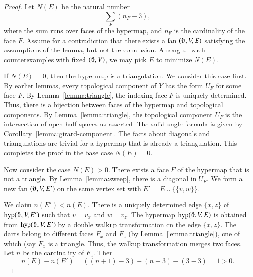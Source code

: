 \begin{proof}
Let $N(E)$ be the natural number
$$
\sum_F (n_F - 3),
$$
where the sum runs over faces of the hypermap, and $n_F$ is the
cardinality of the face $F$.
Assume for a contradiction that there exists a fan $(\orgn,V,E)$ 
satisfying the assumptions of the lemma, but not the conclusion.
Among all such counterexamples with fixed $(\orgn,V)$, we may pick
$E$ to minimize  $N(E)$.

If $N(E)=0$, then the hypermap is a triangulation.  We consider this
case first.  By earlier lemmas, every topological component of $Y$ has
the form $U_F$ for some face $F$.  By Lemma~\ref{lemma:triangle}, the indexing
face $F$ is uniquely determined.  Thus, there is a bijection between
faces of the hypermap and topological components.  By Lemma~\ref{lemma:triangle}, the topological component $U_F$ is the intersection of open half-spaces as asserted.  The solid angle formula is given by Corollary~\ref{lemma:girard-component}.  The facts about diagonals and triangulations are trivial for a hypermap
that is already a triangulation. This completes the proof in the base
case $N(E)=0$.


Now consider the case $N(E)>0$.  There exists a face $F$ of the hypermap
that is not a triangle.  By Lemma~\ref{lemma:sweep}, there is a diagonal in $U_F$.
We form a new fan $(\orgn,V,E')$ on the same vertex set with
$E' = E\cup \{\{v,w\}\}$.   

We claim $n(E')<n(E)$.
There is a uniquely determined edge $\{x,z\}$ of
$\op{hyp}(\orgn,V,E')$ such that $v=v_x$ and $w=v_z$. The hypermap $\op{hyp}(\orgn,V,E)$ is obtained
from $\op{hyp}(\orgn,V,E')$ by a double walkup transformation on the
edge $\{x,z\}$.  The darts belong to different faces $F_x$ and $F_z$
(by Lemma~\ref{lemma:triangle}), one of which (say $F_x$ is a triangle.  Thus, the
walkup transformation merges two faces.  Let $n$ be the cardinality of $F_z$.
Then 
$$n(E) - n(E') = ((n+1)-3) - (n-3) - (3-3) = 1 >0.$$


\end{proof}
